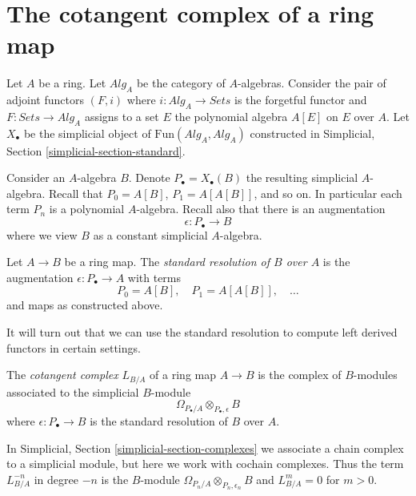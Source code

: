 \section{The cotangent complex of a ring map}
\label{section-cotangent-ring-map}

\noindent
Let $A$ be a ring. Let $\textit{Alg}_A$ be the category of $A$-algebras.
Consider the pair of adjoint functors $(F, i)$ where
$i : \textit{Alg}_A \to \textit{Sets}$ is the forgetful functor and
$F : \textit{Sets} \to \textit{Alg}_A$ assigns to a set $E$ the polynomial
algebra $A[E]$ on $E$ over $A$. Let $X_\bullet$ be the simplicial object of
$\text{Fun}(\textit{Alg}_A, \textit{Alg}_A)$ constructed in
Simplicial, Section \ref{simplicial-section-standard}.

\medskip\noindent
Consider an $A$-algebra $B$. Denote $P_\bullet = X_\bullet(B)$ the resulting
simplicial $A$-algebra. Recall that $P_0 = A[B]$, $P_1 = A[A[B]]$, and so on.
In particular each term $P_n$ is a polynomial $A$-algebra.
Recall also that there is an augmentation
$$
\epsilon : P_\bullet \longrightarrow B
$$
where we view $B$ as a constant simplicial $A$-algebra.

\begin{definition}
\label{definition-standard-resolution}
Let $A \to B$ be a ring map. The {\it standard resolution of $B$ over $A$}
is the augmentation $\epsilon : P_\bullet \to A$ with terms
$$
P_0 = A[B],\quad P_1 = A[A[B]],\quad \ldots
$$
and maps as constructed above.
\end{definition}

\noindent
It will turn out that we can use the standard resolution
to compute left derived functors in certain settings.

\begin{definition}
\label{definition-cotangent-complex-ring-map}
The {\it cotangent complex} $L_{B/A}$ of a ring map $A \to B$
is the complex of $B$-modules associated to the simplicial $B$-module
$$
\Omega_{P_\bullet/A} \otimes_{P_\bullet, \epsilon} B
$$
where $\epsilon : P_\bullet \to B$ is the standard resolution
of $B$ over $A$.
\end{definition}

\noindent
In Simplicial, Section \ref{simplicial-section-complexes} we associate a
chain complex to a simplicial module, but here we work with cochain complexes.
Thus the term $L_{B/A}^{-n}$ in degree $-n$ is the $B$-module
$\Omega_{P_n/A} \otimes_{P_n, \epsilon_n} B$ and $L_{B/A}^m = 0$
for $m > 0$.

